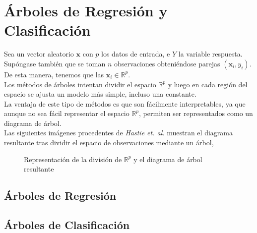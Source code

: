 \newpage
\section{Árboles de Regresión y Clasificación}
\noindent Sea un vector aleatorio $\textbf{x}$ con $p$ los datos de entrada, e $Y$ la variable respuesta. Supóngase también que se toman $n$ observaciones obteniéndose parejas $(\textbf{x}_i,y_i)$. De esta manera, tenemos que las $\textbf{x}_i\in \mathbb{R}^p$.\\
Los métodos de árboles intentan dividir el espacio $\mathbb{R}^p$ y luego en cada región del espacio se ajusta un modelo más simple, incluso una constante.\\
La ventaja de este tipo de métodos es que son fácilmente interpretables, ya que aunque no sea fácil representar el espacio $\mathbb{R}^p$, permiten ser representados como un diagrama de árbol.\\ 
Las  siguientes imágenes procedentes de \textit{Hastie et. al.}\cite{Hastie 2001} muestran el diagrama resultante tras dividir el espacio de observaciones mediante un árbol, 

\begin{figure}[h]
 \centering
 \caption{Representación de la división de $\mathbb{R}^p$ y el diagrama de árbol resultante}
 \label{f:MARC1}
\end{figure}


\subsection{Árboles de Regresión}

\subsection{Árboles de Clasificación }